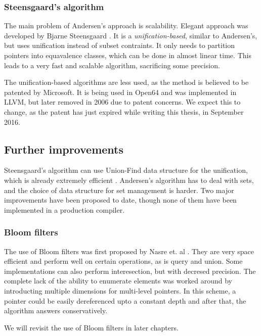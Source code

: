 \subsubsection{Steensgaard's algorithm}

The main problem of Andersen's approach is scalability. 
Elegant approach was developed by Bjarne Steensgaard \cite{Steensgaard96}. It is  a {\it
unification-based}, similar to Andersen's, but uses unification instead of
subset contraints. It only needs to partition pointers into equavalence
classes, which can be done in almost linear time. This leads to a very fast and
scalable algorithm, sacrificing some precision.

The unification-based algorithms are less used, as the method is
believed to be patented by Microsoft\cite{patent:steensgaard}. It is being used
in Open64 and was implemented in LLVM, but later removed in 2006
\cite{LLVM:DSA:Remove} due to patent concerns. We expect this to change, as the
patent has just expired while writing this thesis, in September 2016.

\subsection{Further improvements}

Steensgaard's algorithm can use Union-Find data structure for the unification,
which is already extremely efficient \cite{Tarjan1975}. Andersen's algorithm has
to deal with sets, and the choice of data structure for set management is
harder. Two major improvements have been proposed to date, though none of them
have been implemented in a production compiler.

\subsubsection{Bloom filters}

The use of Bloom filters was first proposed by Nasre et. al \cite{nasre2009}.
They are very space efficient and perform well on certain operations, as is
query and union. Some implementations can also perform interesection, but with
decresed precision. The complete lack of the ability to enumerate elements was
worked around by introducting multiple dimensions for multi-level pointers. In
this scheme, a pointer could be easily dereferenced upto a constant depth and
after that, the algorithm answers conservatively.

We will revisit the use of Bloom filters in later chapters.

